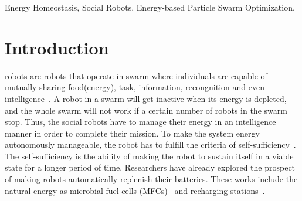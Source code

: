 \documentclass[journal]{IEEEtran}
\begin{document}
\begin{IEEEkeywords}
Energy Homeostasis, Social Robots, Energy-based Particle Swarm Optimization.
\end{IEEEkeywords}

%
\IEEEpeerreviewmaketitle

\section{Introduction}
\label{sec:1}
% 
% 
% 
% 
 robots are robots that operate in swarm where individuals are capable of mutually sharing food(energy), task, information, recongnition and even intelligence~\cite{Ngo}. A robot in a swarm will get inactive when its energy is depleted, and the whole swarm will not work if a certain number of robots in the swarm stop. Thus, the social robots have to manage their energy in an intelligence manner in order to complete their mission. To make the system energy autonomously manageable, the robot has to fulfill the criteria of self-sufficiency~\cite{McFarland}. The self-sufficiency is the ability of making the robot to sustain itself in a viable state for a longer period of time. Researchers have already explored the prospect of making robots automatically replenish their batteries. These works include the natural energy as microbial fuel cells (MFCs)~\cite{Du,MelhuishI} and recharging stations~\cite{Drener, Silverman, Walter}.
\end{document}
